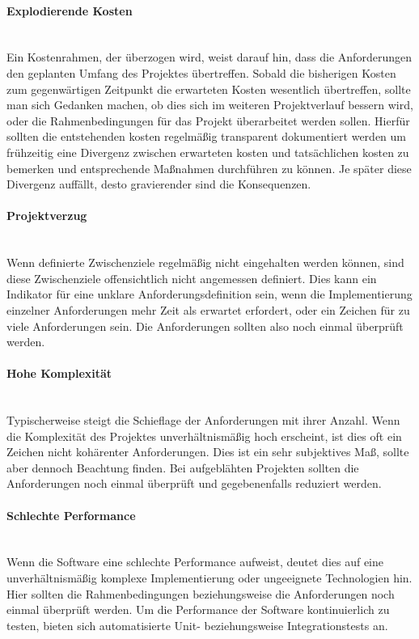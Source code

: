 \documentclass[a4paper, ngerman, 12pt, usenames, dvipsnames]{article}
\begin{document}
\paragraph{Explodierende Kosten}\mbox{} \\
Ein Kostenrahmen, der überzogen wird, weist darauf hin, dass die Anforderungen den geplanten Umfang des Projektes übertreffen. Sobald die bisherigen Kosten zum gegenwärtigen Zeitpunkt die erwarteten Kosten wesentlich übertreffen, sollte man sich Gedanken machen, ob dies sich im weiteren Projektverlauf bessern wird, oder die Rahmenbedingungen für das Projekt überarbeitet werden sollen. Hierfür sollten die entstehenden kosten regelmäßig transparent dokumentiert werden um frühzeitig eine Divergenz zwischen erwarteten kosten und tatsächlichen kosten zu bemerken und entsprechende Maßnahmen durchführen zu können. Je später diese Divergenz auffällt, desto gravierender sind die Konsequenzen.  
\paragraph{Projektverzug}\mbox{} \\
Wenn definierte Zwischenziele regelmäßig nicht eingehalten werden können, sind diese Zwischenziele offensichtlich nicht angemessen definiert. Dies kann ein Indikator für eine unklare Anforderungsdefinition sein, wenn die Implementierung einzelner Anforderungen mehr Zeit als erwartet erfordert, oder ein Zeichen für zu viele Anforderungen sein. Die Anforderungen sollten also noch einmal überprüft werden. 
\paragraph{Hohe Komplexität}\mbox{} \\
Typischerweise steigt die Schieflage der Anforderungen mit ihrer Anzahl. Wenn die Komplexität des Projektes unverhältnismäßig hoch erscheint, ist dies oft ein Zeichen nicht kohärenter Anforderungen. Dies ist ein sehr subjektives Maß, sollte aber dennoch Beachtung finden. Bei aufgeblähten Projekten sollten die Anforderungen noch einmal überprüft und gegebenenfalls reduziert werden.
\paragraph{Schlechte Performance}\mbox{} \\
Wenn die Software eine schlechte Performance aufweist, deutet dies auf eine unverhältnismäßig komplexe Implementierung oder ungeeignete Technologien hin. Hier sollten die Rahmenbedingungen beziehungsweise die Anforderungen noch einmal überprüft werden. Um die Performance der Software kontinuierlich zu testen, bieten sich automatisierte Unit- beziehungsweise Integrationstests an.
\end{document}
